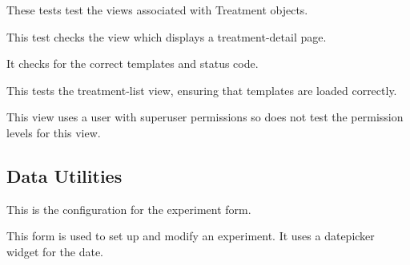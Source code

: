 \documentclass[letterpaper,10pt,english]{sphinxmanual}
\begin{document}

\begin{fulllineitems}
\label{data:mousedb.data.tests.TreatmentViewTests}
These tests test the views associated with Treatment objects.

\begin{fulllineitems}
\label{data:mousedb.data.tests.TreatmentViewTests.test_treatment_detail}
This test checks the view which displays a treatment-detail page.

It checks for the correct templates and status code.

\end{fulllineitems}


\begin{fulllineitems}
\label{data:mousedb.data.tests.TreatmentViewTests.test_treatment_list}
This tests the treatment-list view, ensuring that templates are loaded correctly.

This view uses a user with superuser permissions so does not test the permission levels for this view.

\end{fulllineitems}


\end{fulllineitems}



\subsection{Data Utilities}
\label{data:module-mousedb.data.forms}\label{data:data-utilities}

\begin{fulllineitems}
\label{data:mousedb.data.forms.ExperimentForm}
This is the configuration for the experiment form.

This form is used to set up and modify an experiment.  It uses a datepicker widget for the date.

\end{fulllineitems}
\end{document}
